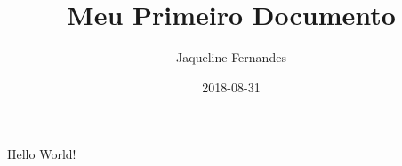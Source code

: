\documentclass{article}
\title{Meu Primeiro Documento}
\date{2018-08-31}
\author{Jaqueline Fernandes}
\begin{document}
	\maketitle
	\newpage
	

	Hello World!
	
\end{document}
